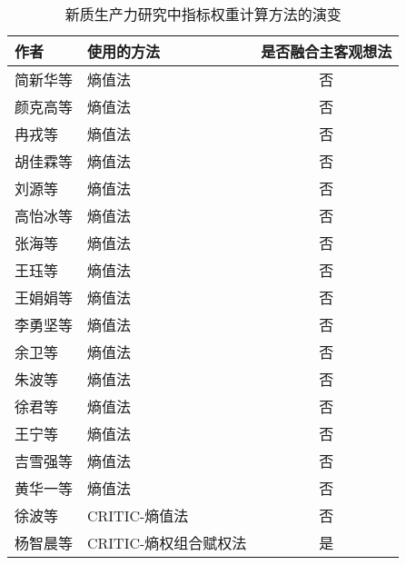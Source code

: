 \documentclass[nonblindrev]{write_paper}
\begin{document}
\begin{table}[htbp]
  \footnotesize
  \centering
  \caption{新质生产力研究中指标权重计算方法的演变}
  \label{tab:weight_methods}
  \begin{tabular}{lp{6cm}c}
    \toprule
    作者 & 使用的方法 & 是否融合主客观想法 \\
    \midrule
    简新华等\citep{简新华2024中国新质生产力水平测度及省际现状的比较分析} & 熵值法 & 否 \\
    颜克高等\citep{颜克高2025中国新质生产力发展的水平测度与区域差异研究} & 熵值法 & 否 \\
    冉戎等\citep{冉戎2024新质生产力发展潜力测度、时空差异及战略着力点研究} & 熵值法 & 否 \\
    胡佳霖等\citep{胡佳霖2024中国新质生产力：区域差距、动态演进与跃迁趋势} & 熵值法 & 否 \\
    刘源等\citep{刘源2025新质生产力发展水平动态演进、影响因素及提升路径} & 熵值法 & 否 \\
    高怡冰等\citep{高怡冰2024中国新质生产力的发展水平和演进趋势} & 熵值法 & 否 \\
    张海等\citep{张海2024新质生产力发展水平、空间差异及动态演进} & 熵值法 & 否 \\
    王珏等\citep{王珏2024新质生产力：指标构建与时空演进} & 熵值法 & 否 \\
    王娟娟等\citep{王娟娟2024新质生产力对产业布局的影响与区域锁定} & 熵值法 & 否 \\
    李勇坚等\citep{李勇坚2025新质生产力的科学内涵、要素基础与测度研究} & 熵值法 & 否 \\
    余卫等\citep{余卫2024数字经济赋能新质生产力发展的内在机理与提升路径研究} & 熵值法 & 否 \\
    朱波等\citep{朱波2024数字金融发展对区域新质生产力的影响及作用机制} & 熵值法 & 否 \\
    徐君等\citep{徐君2025新型工业化与新质生产力耦合协调度} & 熵值法 & 否 \\
    王宁等\citep{王宁2024新质生产力发展水平测度、动态演进与时空收敛特征} & 熵值法 & 否 \\
    吉雪强等\citep{吉雪强2025中国新质生产力空间关联网络结构时空演化特征及驱动因素} & 熵值法 & 否 \\
    黄华一等\citep{黄华一2025新质生产力的统计测度与区域差异分析} & 熵值法 & 否 \\
    徐波等\citep{徐波2024新质生产力对资源配置效率的影响效应研究} & CRITIC-熵值法 & 否 \\
    杨智晨等\citep{杨智晨2025我国新质生产力发展的理论基础、时空特征及分异机理} & CRITIC-熵权组合赋权法 & 是 \\

\end{tabular}
\end{table}
\end{document}

